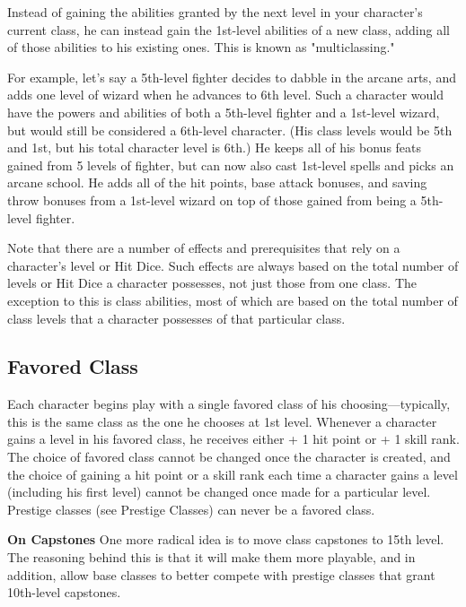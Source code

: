 Instead of gaining the abilities granted by the next level in your character's current class, he can instead gain the 1st-level abilities of a new class, adding all of those abilities to his existing ones. This is known as "multiclassing."
				
For example, let's say a 5th-level fighter decides to dabble in the arcane arts, and adds one level of wizard when he advances to 6th level. Such a character would have the powers and abilities of both a 5th-level fighter and a 1st-level wizard, but would still be considered a 6th-level character. (His class levels would be 5th and 1st, but his total character level is 6th.) He keeps all of his bonus feats gained from 5 levels of fighter, but can now also cast 1st-level spells and picks an arcane school. He adds all of the hit points, base attack bonuses, and saving throw bonuses from a 1st-level wizard on top of those gained from being a 5th-level fighter.
				
Note that there are a number of effects and prerequisites that rely on a character's level or Hit Dice. Such effects are always based on the total number of levels or Hit Dice a character possesses, not just those from one class. The exception to this is class abilities, most of which are based on the total number of class levels that a character possesses of that particular class.

\subsection{Favored Class}


Each character begins play with a single favored class of his choosing---typically, this is the same class as the one he chooses at 1st level. Whenever a character gains a level in his favored class, he receives either + 1 hit point or + 1 skill rank. The choice of favored class cannot be changed once the character is created, and the choice of gaining a hit point or a skill rank each time a character gains a level (including his first level) cannot be changed once made for a particular level. Prestige classes (see Prestige Classes) can never be a favored class. 

\begin{formal}
 \textbf{On Capstones}
 One more radical idea is to move class capstones to 15th level. The reasoning behind this is that it will make them
 more playable, and in addition, allow base classes to better compete with prestige classes that grant 10th-level
 capstones.
\end{formal}














